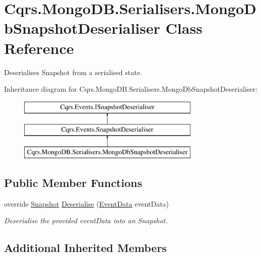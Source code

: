 \hypertarget{classCqrs_1_1MongoDB_1_1Serialisers_1_1MongoDbSnapshotDeserialiser}{}\section{Cqrs.\+Mongo\+D\+B.\+Serialisers.\+Mongo\+Db\+Snapshot\+Deserialiser Class Reference}
\label{classCqrs_1_1MongoDB_1_1Serialisers_1_1MongoDbSnapshotDeserialiser}


Deserialises Snapshot from a serialised state.  


Inheritance diagram for Cqrs.\+Mongo\+D\+B.\+Serialisers.\+Mongo\+Db\+Snapshot\+Deserialiser\+:\begin{figure}[H]
\begin{center}
\leavevmode
\includegraphics[height=3.000000cm]{classCqrs_1_1MongoDB_1_1Serialisers_1_1MongoDbSnapshotDeserialiser}
\end{center}
\end{figure}
\subsection*{Public Member Functions}
\begin{DoxyCompactItemize}
\item 
override \hyperlink{classCqrs_1_1Snapshots_1_1Snapshot}{Snapshot} \hyperlink{classCqrs_1_1MongoDB_1_1Serialisers_1_1MongoDbSnapshotDeserialiser_ad7963b969a1edd5451605887933c0c89_ad7963b969a1edd5451605887933c0c89}{Deserialise} (\hyperlink{classCqrs_1_1Events_1_1EventData}{Event\+Data} event\+Data)
\begin{DoxyCompactList}\small\item\em Deserialise the provided {\itshape event\+Data}  into an Snapshot. \end{DoxyCompactList}\end{DoxyCompactItemize}
\subsection*{Additional Inherited Members}


